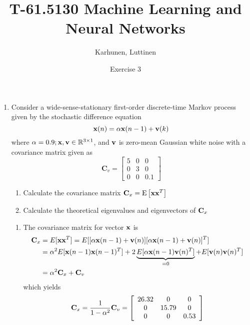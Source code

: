 
\title{T-61.5130 Machine Learning and Neural Networks}
\author{Karhunen, Luttinen}
\date{Exercise 3}





\maketitle

\begin{enumerate}
  
\item Consider a wide-sense-stationary
  first-order discrete-time Markov process given by the stochastic
  difference equation
  \[
  {\bf x}(n) = \alpha {\bf x}(n-1) + {\bf v}(k)
  \]
  where $\alpha = 0.9; {\bf x}, {\bf v} \in \mathbb{R}^{3\times 1}$,
  and ${\bf v}$ is zero-mean Gaussian white noise with a covariance
  matrix given as
  \[ \textbf{C}_v = \left[ \begin{array}{ccc}
      5 & 0 & 0 \\
      0 & 3 & 0 \\
      0 & 0 & 0.1 \end{array} \right]\]

  \begin{enumerate}
  \item Calculate the covariance matrix ${\bf C}_x = \text{E}\left[
      {\bf xx}^T \right]$
  \item Calculate the theoretical eigenvalues and eigenvectors of
    ${\bf C}_x$
  \end{enumerate}
  
  \begin{solution}

    \begin{enumerate}
    \item 
      The covariance matrix for vector $\mathbf{x}$ is
      \[
      \begin{split}
        \mathbf{C}_x &= E[\mathbf{x} \mathbf{x}^T] =
        E[[\alpha\mathbf{x}(n-1)+\mathbf{v}(n)]
        [\alpha\mathbf{x}(n-1)+\mathbf{v}(n)]^T]
        \\
        &=\alpha^2 E[\mathbf{x}(n-1)\mathbf{x}(n-1)^T]+2
        \underbrace{E[\alpha \mathbf{x}(n-1)\mathbf{v}(n)^T]}_{=0}+
        E[\mathbf{v}(n)\mathbf{v}(n)^T]
        \\
        &=\alpha^2 \mathbf{C}_x + \mathbf{C}_v
      \end{split}
      \]
      which yields
      \[
      \mathbf{C}_x = \frac{1}{1-\alpha^2}\mathbf{C}_v=
      \left[\begin{array}{ccc}
          26.32 & 0     & 0 \\
          0     & 15.79 & 0 \\
          0     & 0     & 0.53 
        \end{array}\right]
      \]


\end{enumerate}
\end{solution}
\end{enumerate}
